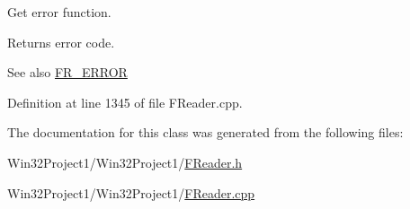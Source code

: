 Get error function. 

\begin{DoxyReturn}{Returns}
error code. 
\end{DoxyReturn}
\begin{DoxySeeAlso}{See also}
\hyperlink{_file_structs_8h_ae183556f32e14e06d49b270ca950d90a}{F\+R\+\_\+\+E\+R\+R\+OR} 
\end{DoxySeeAlso}


Definition at line 1345 of file F\+Reader.\+cpp.



The documentation for this class was generated from the following files\+:\begin{DoxyCompactItemize}
\item 
Win32\+Project1/\+Win32\+Project1/\hyperlink{_f_reader_8h}{F\+Reader.\+h}\item 
Win32\+Project1/\+Win32\+Project1/\hyperlink{_f_reader_8cpp}{F\+Reader.\+cpp}\end{DoxyCompactItemize}
